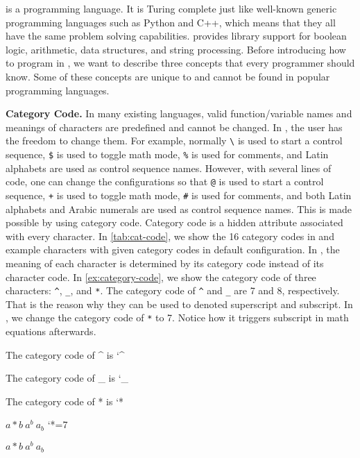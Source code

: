 \documentclass{ltugboat}
\begin{document}
\LT{} is a programming language. 
It is Turing complete just like well-known generic programming languages such as Python and C++, which means that they all have the same problem solving capabilities.
\LT{} provides library support for boolean logic, arithmetic, data structures, and string processing.
Before introducing how to program in \LT{}, we want to describe three concepts that every \LT{} programmer should know.
Some of these concepts are unique to \LT{} and cannot be found in popular programming languages.


\par\medskip\noindent\textbf{Category Code.}
In many existing languages, valid function/variable names and meanings of characters are predefined and cannot be changed.
In \LT{}, the user has the freedom to change them.
For example, normally \verb|\| is used to start a control sequence, \verb|$| is used to toggle math mode, \verb|%| is used for comments, and Latin alphabets are used as control sequence names.
However, with several lines of code, one can change the configurations so that \verb|@| is used to start a control sequence, \verb|+| is used to toggle math mode, \verb|#| is used for comments, and both Latin alphabets and Arabic numerals are used as control sequence names.
This is made possible by using category code.
Category code is a hidden attribute associated with every character.
In \cref{tab:cat-code}, we show the 16 category codes in \LT{} and example characters with given category codes in default \LT{} configuration.
In \LT{}, the meaning of each character is determined by its category code instead of its character code. 
In \cref{ex:category-code}, we show the category code of three characters: \verb|^|, \verb|_|, and \verb|*|.
The category code of \verb|^| and \verb|_| are 7 and 8, respectively. 
That is the reason why they can be used to denoted superscript and subscript.
In , we change the category code of \verb|*| to 7.
Notice how it triggers subscript in math equations afterwards.
\begin{latexsample}[examplelabel={ex:category-code},exampletitle={Category Code}]
\par The category code of \^{} is \the\catcode`^
\par The category code of \_{} is \the\catcode`_
\par The category code of * is \the\catcode`*
\par $a*b~a^b~a_b$
\catcode`*=7
\par $a*b~a^b~a_b$
\end{latexsample}
\end{document}
